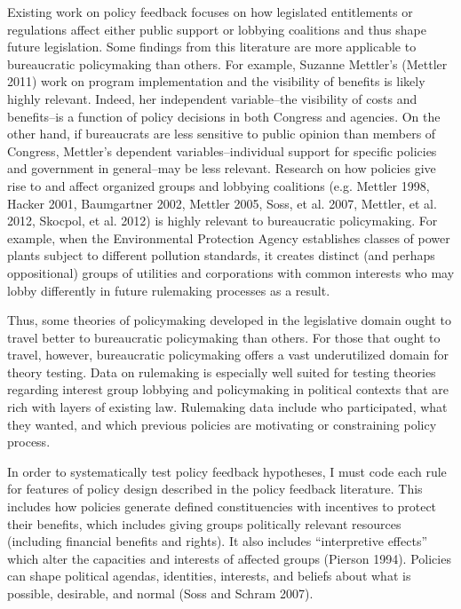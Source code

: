 Existing work on policy feedback focuses on how legislated entitlements or regulations affect either public support or lobbying coalitions and thus shape future legislation. Some findings from this literature are more applicable to bureaucratic policymaking than others. For example, Suzanne Mettler's (Mettler 2011) work on program implementation and the visibility of benefits is likely highly relevant. Indeed, her independent variable--the visibility of costs and benefits--is a function of policy decisions in both Congress and agencies. On the other hand, if bureaucrats are less sensitive to public opinion than members of Congress, Mettler's dependent variables--individual support for specific policies and government in general--may be less relevant. Research on how policies give rise to and affect organized groups and lobbying coalitions (e.g. Mettler 1998, Hacker 2001, Baumgartner 2002, Mettler 2005, Soss, et al. 2007, Mettler, et al. 2012, Skocpol, et al. 2012) is highly relevant to bureaucratic policymaking. For example, when the Environmental Protection Agency establishes classes of power plants subject to different pollution standards, it creates distinct (and perhaps oppositional) groups of utilities and corporations with common interests who may lobby differently in future rulemaking processes as a result. 

Thus, some theories of policymaking developed in the legislative domain ought to travel better to bureaucratic policymaking than others. For those that ought to travel, however, bureaucratic policymaking offers a vast underutilized domain for theory testing. Data on rulemaking is especially well suited for testing theories regarding interest group lobbying and policymaking in political contexts that are rich with layers of existing law. Rulemaking data include who participated, what they wanted, and which previous policies are motivating or constraining policy process. 


In order to systematically test policy feedback hypotheses, I must code each rule %
for features of policy design described in the policy feedback literature. %
This includes how policies generate defined constituencies with incentives to protect their benefits, which includes giving groups politically relevant resources (including financial benefits and rights). It also includes ``interpretive effects'' which alter the capacities and interests of affected groups (Pierson 1994). Policies can shape political agendas, identities, interests, and beliefs about what is possible, desirable, and normal (Soss and Schram 2007).

